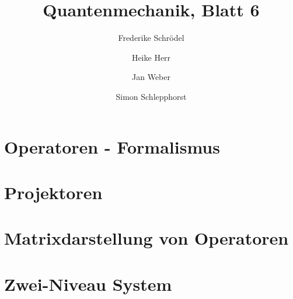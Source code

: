 \documentclass[11pt, ngerman, fleqn, DIV=15, headinclude]{scrartcl}
\title{Quantenmechanik, Blatt 6}
\author{
    Frederike Schrödel \and Heike Herr \and Jan Weber \and Simon Schlepphorst
}
\begin{document}
\maketitle

\section{Operatoren - Formalismus}

\section{Projektoren}

\section{Matrixdarstellung von Operatoren}

\section{Zwei-Niveau System}
\end{document}
